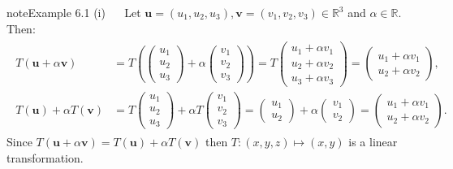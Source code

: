 \documentclass[letterpaper,10pt,english]{jupyterBook}
\begin{document}
\begin{sphinxadmonition}{note}{Example 6.1}
\sphinxAtStartPar
(i)   Let \(\mathbf{u} = (u_1, u_2, u_3), \mathbf{v} = (v_1, v_2, v_3) \in \mathbb{R}^3\) and \(\alpha \in \mathbb{R}\). Then:
\begin{equation*}
\begin{split} \begin{align*}
    T(\mathbf{u} + \alpha \mathbf{v}) &= T\left(
        \begin{pmatrix} u_1 \\ u_2 \\ u_3 \end{pmatrix} + \alpha
        \begin{pmatrix} v_1 \\ v_2 \\ v_3 \end{pmatrix}
    \right)
    = T \begin{pmatrix} u_1 + \alpha v_1 \\ u_2 + \alpha v_2 \\ u_3 + \alpha v_3 \end{pmatrix}
    = \begin{pmatrix} u_1 + \alpha v_1 \\  u_2 + \alpha v_2 \end{pmatrix}, \\
    T(\mathbf{u}) + \alpha T(\mathbf{v}) &= T
    \begin{pmatrix} u_1 \\ u_2 \\ u_3 \end{pmatrix} + \alpha T
    \begin{pmatrix} v_1 \\ v_2 \\ v_3 \end{pmatrix} =
    \begin{pmatrix} u_1 \\ u_2 \end{pmatrix} + \alpha
    \begin{pmatrix} v_1 \\ v_2 \end{pmatrix} =
    \begin{pmatrix} u_1 + \alpha v_1 \\ u_2 + \alpha v_2 \end{pmatrix}.
\end{align*} \end{split}
\end{equation*}
\sphinxAtStartPar
Since \(T(\mathbf{u} + \alpha \mathbf{v}) = T(\mathbf{u}) + \alpha T(\mathbf{v})\) then \(T: (x, y, z) \mapsto (x, y)\) is a linear transformation.


\end{sphinxadmonition}
\end{document}
